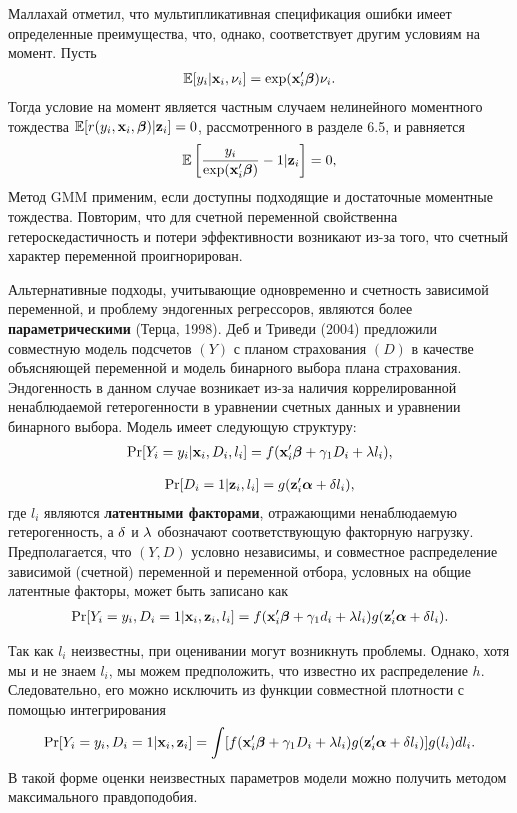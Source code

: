 Маллахай отметил, что мультипликативная спецификация ошибки имеет определенные преимущества, что, однако, соответствует другим условиям на момент. Пусть
    \begin{align}\label{eq:20.29}
    \mathbb{E}[y_i|\mathbf{x}_i, \nu_i] = \exp(\mathbf{x}_i'\bm{\beta})\nu_i.
    \end{align}
Тогда условие на момент является частным случаем нелинейного моментного тождества $\mathbb{E}[r(y_i, \mathbf{x}_i, \bm{\beta})|\mathbf{z}_i] = 0$, рассмотренного в разделе 6.5, и равняется
    \begin{align}\label{eq:20.30}
    \mathbb{E}\left[ \frac{y_i}{\exp(\mathbf{x}_i'\bm{\beta})} - 1| \mathbf{z}_i \right] = 0,
    \end{align}
Метод GMM применим, если доступны подходящие и достаточные моментные тождества. Повторим, что для счетной переменной свойственна гетероскедастичность и потери эффективности возникают из-за того, что счетный характер переменной проигнорирован.

Альтернативные подходы, учитывающие одновременно и счетность зависимой переменной, и проблему эндогенных регрессоров, являются более \textbf{параметрическими} (Терца, 1998). Деб и Триведи (2004) предложили совместную модель подсчетов $(Y)$ с планом страхования $(D)$ в качестве объясняющей переменной и модель бинарного выбора плана страхования. Эндогенность в данном случае возникает из-за наличия коррелированной ненаблюдаемой гетерогенности в уравнении счетных данных и уравнении бинарного выбора.
Модель имеет следующую структуру:
    \begin{align}\label{eq:20.31}
    \mathrm{Pr}[Y_i = y_i|\mathbf{x}_i, D_i, l_i] = f(\mathbf{x}_i'\bm{\beta} + \gamma_1 D_i + \lambda l_i),
    \end{align}

    \begin{align}\label{eq:20.32}
    \mathrm{Pr}[D_i = 1|\mathbf{z}_i, l_i] = g(\mathbf{z}'_i \bm{\alpha} + \delta l_i),
    \end{align}
где $l_i$ являются \textbf{латентными факторами}, отражающими ненаблюдаемую гетерогенность, а $\delta$ и $\lambda$ обозначают соответствующую факторную нагрузку. Предполагается, что $(Y, D)$ условно независимы, и совместное распределение зависимой (счетной) переменной и переменной отбора, условных на общие латентные факторы, может быть записано как
    \begin{align}\label{eq:20.33}
    \mathrm{Pr}[Y_i = y_i, D_i = 1|\mathbf{x}_i, \mathbf{z}_i, l_i] = f(\mathbf{x}_i'\bm{\beta} + \gamma_1 d_i + \lambda l_i) g(\mathbf{z}'_i \bm{\alpha} + \delta l_i).
    \end{align}

Так как $l_i$ неизвестны, при оценивании могут возникнуть проблемы. Однако, хотя мы и не знаем $l_i$, мы можем предположить, что известно их распределение $h$. Следовательно, его можно исключить из функции совместной плотности с помощью интегрирования
    \begin{align}\label{eq:20.34}
    \mathrm{Pr}[Y_i = y_i, D_i = 1|\mathbf{x}_i, \mathbf{z}_i] = \int [f(\mathbf{x}_i'\bm{\beta} + \gamma_1 D_i + \lambda l_i)g(\mathbf{z}'_i\bm{\alpha} + \delta l_i)]g(l_i)dl_i.
    \end{align}
В такой форме оценки неизвестных параметров модели можно получить методом максимального правдоподобия.

